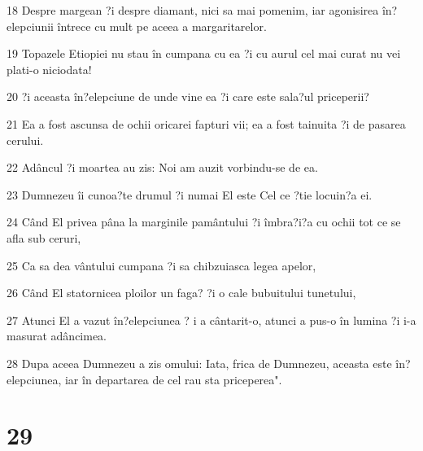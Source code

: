 \par 18 Despre margean ?i despre diamant, nici sa mai pomenim, iar agonisirea în?elepciunii întrece cu mult pe aceea a margaritarelor.
\par 19 Topazele Etiopiei nu stau în cumpana cu ea ?i cu aurul cel mai curat nu vei plati-o niciodata!
\par 20 ?i aceasta în?elepciune de unde vine ea ?i care este sala?ul priceperii?
\par 21 Ea a fost ascunsa de ochii oricarei fapturi vii; ea a fost tainuita ?i de pasarea cerului.
\par 22 Adâncul ?i moartea au zis: Noi am auzit vorbindu-se de ea.
\par 23 Dumnezeu îi cunoa?te drumul ?i numai El este Cel ce ?tie locuin?a ei.
\par 24 Când El privea pâna la marginile pamântului ?i îmbra?i?a cu ochii tot ce se afla sub ceruri,
\par 25 Ca sa dea vântului cumpana ?i sa chibzuiasca legea apelor,
\par 26 Când El statornicea ploilor un faga? ?i o cale bubuitului tunetului,
\par 27 Atunci El a vazut în?elepciunea ? i a cântarit-o, atunci a pus-o în lumina ?i i-a masurat adâncimea.
\par 28 Dupa aceea Dumnezeu a zis omului: Iata, frica de Dumnezeu, aceasta este în?elepciunea, iar în departarea de cel rau sta priceperea".

\chapter{29}

